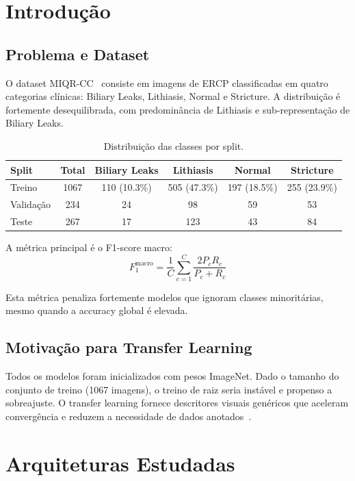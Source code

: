 \documentclass[runningheads]{llncs}
\begin{document}
\section{Introdução}

\subsection{Problema e Dataset}
O dataset MIQR-CC~\cite{martins2025} consiste em imagens de ERCP classificadas em quatro
categorias clínicas: Biliary Leaks, Lithiasis, Normal e Stricture. A
distribuição é fortemente desequilibrada, com predominância de Lithiasis e
sub-representação de Biliary Leaks.

\begin{table}[ht]
\caption{Distribuição das classes por split.}
\label{tab:dataset_split}
\centering
\begin{tabular}{lccccc}
\hline
Split & Total & Biliary Leaks & Lithiasis & Normal & Stricture \\
\hline
Treino & 1067 & 110 (10.3\%) & 505 (47.3\%) & 197 (18.5\%) & 255 (23.9\%) \\
Validação & 234 & 24 & 98 & 59 & 53 \\
Teste & 267 & 17 & 123 & 43 & 84 \\
\hline
\end{tabular}
\end{table}

A métrica principal é o F1-score macro:
\begin{equation}
F_1^{\text{macro}} = \frac{1}{C}\sum_{c=1}^{C} \frac{2 P_c R_c}{P_c + R_c}
\end{equation}

Esta métrica penaliza fortemente modelos que ignoram classes minoritárias,
mesmo quando a accuracy global é elevada.

\subsection{Motivação para Transfer Learning}
Todos os modelos foram inicializados com pesos ImageNet. Dado o tamanho do
conjunto de treino (1067 imagens), o treino de raiz seria instável e propenso
a sobreajuste. O transfer learning fornece descritores visuais genéricos que
aceleram convergência e reduzem a necessidade de dados anotados~\cite{tajbakhsh2016}.

\section{Arquiteturas Estudadas}
\end{document}
